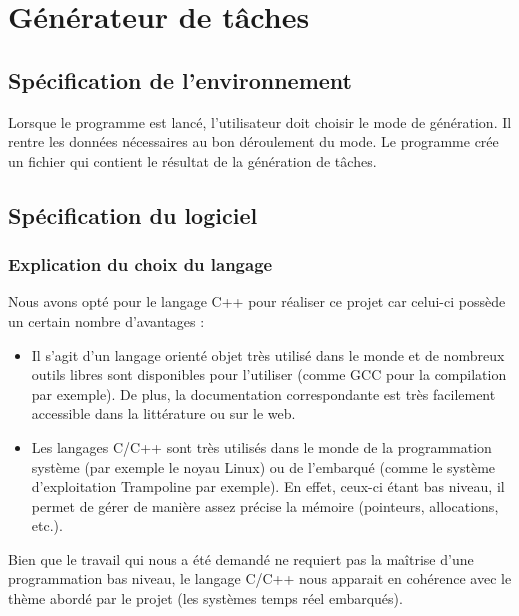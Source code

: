 

\chapter{Générateur de tâches}
	\label{chap:1}
	
	\section{Spécification de l’environnement}
	Lorsque le programme est lancé, l’utilisateur doit choisir le mode de génération. Il rentre les données nécessaires au bon déroulement du mode. Le programme crée un fichier qui contient le résultat de la génération de tâches.


	\section{Spécification du logiciel}

		\subsection{Explication du choix du langage}
	
			\label{sec:langage}
			Nous avons opté pour le langage C++ pour réaliser ce projet car celui-ci possède un certain nombre d'avantages :
			\begin{itemize}
				\item Il s'agit d'un langage orienté objet très utilisé dans le monde et de nombreux outils libres sont disponibles pour l'utiliser (comme GCC pour la compilation par exemple). De plus, la documentation correspondante est très facilement accessible dans la littérature ou sur le web.
				\item Les langages C/C++ sont très utilisés dans le monde de la programmation système (par exemple le noyau Linux) ou de l'embarqué (comme le système d'exploitation Trampoline par exemple). En effet, ceux-ci étant bas niveau, il permet de gérer de manière assez précise la mémoire (pointeurs, allocations, etc.).
			\end{itemize}
		
			Bien que le travail qui nous a été demandé ne requiert pas la maîtrise d'une programmation bas niveau, le langage C/C++ nous apparait en cohérence avec le thème abordé par le projet (les systèmes temps réel embarqués).

